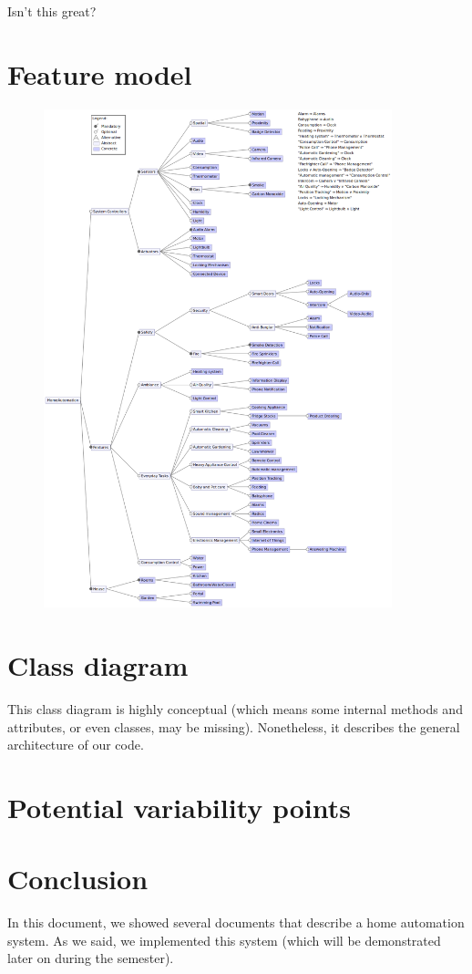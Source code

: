 			Isn't this great?
		
	\section{Feature model}		
        \begin{figure}[H]
            \includegraphics[width=0.9\textwidth]{FeatureModel_3.png}
        \end{figure}
	
	\section{Class diagram}
		This class diagram is highly conceptual (which means some internal methods and attributes, or even classes, may be missing). Nonetheless, it describes the general architecture of our code.
		
		
	\section{Potential variability points}
	
	\section{Conclusion}
		In this document, we showed several documents that describe a home automation system.
		As we said, we implemented this system (which will be demonstrated later on during the semester).


